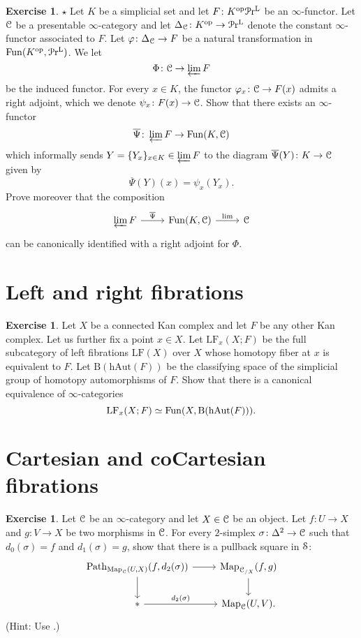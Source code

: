 \documentclass[10pt,a4paper,reqno,oneside]{book} %
\theoremstyle{plain}
\theoremstyle{definition}
\newtheorem{exercise}[thm]{Exercise}
\theoremstyle{remark}
\numberwithin{equation}{section}
\begin{document}
\begin{exercise}
	$\star$ Let $K$ be a simplicial set and let $F \colon K^\mathrm{op} \mathcal{P}\mathrm{r}^\mathrm L$ be an $\infty$-functor.
	Let $\mathcal C$ be a presentable $\infty$-category and let $\Delta_\mathcal C \colon K^\mathrm{op} \to \mathcal{P}\mathrm{r}^\mathrm L$ denote the constant $\infty$-functor associated to $F$.
	Let $\varphi \colon \Delta_\mathcal C \to F$ be a natural transformation in $\operatorname{Fun}(K^\mathrm{op}, \mathcal{P}\mathrm{r}^\mathrm L)$.
	We let
	\[ \Phi \colon \mathcal C \to \varprojlim F \]
	be the induced functor.
	For every $x \in K$, the functor $\varphi_x \colon \mathcal C \to F(x)$ admits a right adjoint, which we denote $\psi_x \colon F(x) \to \mathcal C$.
	Show that there exists an $\infty$-functor
	\[ \overline{\Psi} \colon \varprojlim F \to \operatorname{Fun}(K, \mathcal C) \]
	which informally sends $Y = \{Y_x\}_{x \in K} \in \varprojlim F$ to the diagram $\overline{\Psi}(Y) \colon K \to \mathcal C$ given by
	\[ \overline{\Psi}(Y)(x) = \psi_x(Y_x) . \]
	Prove moreover that the composition
	\[ \begin{tikzcd}
		\varprojlim F \arrow{r}{\overline{\Psi}} & \Fun(K, \cC) \arrow{r}{\mathrm{lim}} & \cC
	\end{tikzcd} \]
	can be canonically identified with a right adjoint for $\Phi$.
\end{exercise}

\section{Left and right fibrations}

\begin{exercise}
	Let $X$ be a connected Kan complex and let $F$ be any other Kan complex.
	Let us further fix a point $x \in X$.
	Let $\mathrm{LF}_x(X;F)$ be the full subcategory of left fibrations $\mathrm{LF}(X)$ over $X$ whose homotopy fiber at $x$ is equivalent to $F$.
	Let $\mathrm{B}(\mathrm{hAut}(F))$ be the classifying space of the simplicial group of homotopy automorphisms of $F$.
	Show that there is a canonical equivalence of $\infty$-categories
	\[ \mathrm{LF}_x(X;F) \simeq \operatorname{Fun}(X, \mathrm{B}(\mathrm{hAut}(F))) . \]
\end{exercise}

\section{Cartesian and coCartesian fibrations}

\begin{exercise}
	Let $\mathcal C$ be an $\infty$-category and let $X \in \mathcal C$ be an object.
	Let $f \colon U \to X$ and $g \colon V \to X$ be two morphisms in $\mathcal C$.
	For every $2$-simplex $\sigma \colon \Delta^2 \to \mathcal C$ such that $d_0(\sigma) = f$ and $d_1(\sigma) = g$, show that there is a pullback square in $\mathcal S$:
	\[ \begin{tikzcd}
		\mathrm{Path}_{\Map_{\cC}(U,X)}(f, d_2(\sigma)) \arrow{r} \arrow{d} & \mathrm{Map}_{\cC_{/X}}(f,g) \arrow{d} \\
		* \arrow{r}{d_2(\sigma)} & \Map_{\cC}(U,V) .
	\end{tikzcd} \]
	(Hint: Use \cite[Propositions 2.1.2.1 and 2.4.4.2]{HTT}.)
\end{exercise}
\end{document}
